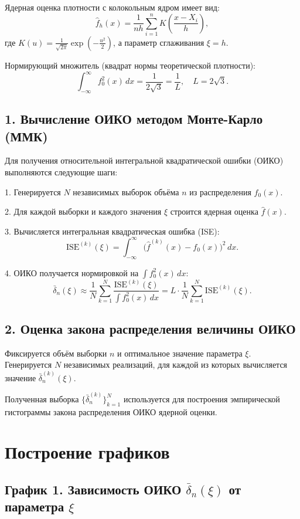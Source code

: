 \documentclass[12pt,a4paper]{article}
\begin{document}
Ядерная оценка плотности с колокольным ядром имеет вид:
\[
\hat{f}_h(x) = \frac{1}{nh} \sum_{i=1}^n K\left( \frac{x - X_i}{h} \right),
\]
где \( K(u) = \frac{1}{\sqrt{2\pi}} \exp\left( -\frac{u^2}{2} \right) \), а параметр сглаживания \(\xi = h\).

Нормирующий множитель (квадрат нормы теоретической плотности):
\[
\int_{-\infty}^{\infty} f_0^2(x)\, dx = \frac{1}{2\sqrt{3}} = \frac{1}{L}, \quad L = 2\sqrt{3}.
\]

\subsection*{1. Вычисление ОИКО методом Монте-Карло (ММК)}

Для получения относительной интегральной квадратической ошибки (ОИКО) выполняются следующие шаги:

1. Генерируется \(N\) независимых выборок объёма \(n\) из распределения \(f_0(x)\).


2. Для каждой выборки и каждого значения \(\xi\) строится ядерная оценка \(\hat{f}(x)\).


3. Вычисляется интегральная квадратическая ошибка (ISE):
   \[
   \text{ISE}^{(k)}(\xi) = \int_{-\infty}^{\infty} \bigl(\hat{f}^{(k)}(x) - f_0(x)\bigr)^2 \, dx.
   \]
   
4. ОИКО получается нормировкой на \(\int f_0^2(x)\, dx\):
   \[
   \bar{\delta}_n(\xi) \approx \frac{1}{N} \sum_{k=1}^N \frac{\text{ISE}^{(k)}(\xi)}{\int f_0^2(x)\, dx} = L \cdot \frac{1}{N} \sum_{k=1}^N \text{ISE}^{(k)}(\xi).
   \]

\subsection*{2. Оценка закона распределения величины ОИКО}

Фиксируется объём выборки \(n\) и оптимальное значение параметра \(\xi\). Генерируется \(N\) независимых реализаций, для каждой из которых вычисляется значение \(\bar{\delta}_n^{(k)}(\xi)\).

Полученная выборка \(\{\bar{\delta}_n^{(k)}\}_{k=1}^N\) используется для построения эмпирической гистограммы закона распределения ОИКО ядерной оценки.

\newpage
\section*{Построение графиков}

\subsection*{График 1. Зависимость ОИКО \(\bar{\delta}_n(\xi)\) от параметра \(\xi\)}
\end{document}
